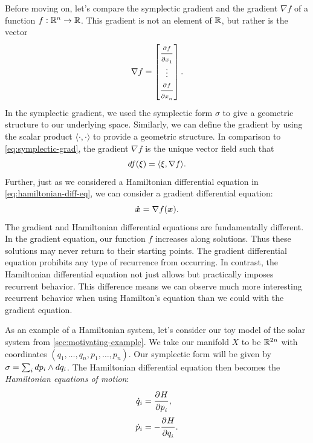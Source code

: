 \documentclass[twoside,letterpaper,10pt]{article}
\begin{document}
Before moving on, let's compare the symplectic gradient and the gradient $\nabla
f$ of a function $f : \mathbb{R}^n \to \mathbb{R}$.
This gradient is not an element of $\mathbb{R}$, but rather is the vector
\begin{equation*}
  \nabla f =
  \begin{bmatrix}
    \frac{\strut\partial^{}f}{\strut\partial x_1^{}}\\
    \vdots\\
    \frac{\strut\partial^{}f}{\strut\partial x_n^{}}
  \end{bmatrix}.
\end{equation*}
In the symplectic gradient, we used the symplectic form $\sigma$ to give a
geometric structure to our underlying space.
Similarly, we can define the gradient by using the scalar product $\langle
\cdot, \cdot \rangle$ to provide a geometric structure.
In comparison to \cref{eq:symplectic-grad}, the gradient $\nabla f$ is the
unique vector field such that
\begin{equation*}
  \mathop{}\!d f(\xi) = \langle \xi, \nabla f \rangle.
\end{equation*}
Further, just as we considered a Hamiltonian differential equation in
\cref{eq:hamiltonian-diff-eq}, we can consider a gradient differential equation:
\begin{equation*}
  \bm{\dot{x}} = \nabla f(\bm{x}).
\end{equation*}
The gradient and Hamiltonian differential equations are fundamentally different.
In the gradient equation, our function $f$ increases along solutions.
Thus these solutions may never return to their starting points.
The gradient differential equation prohibits any type of recurrence from
occurring.
In contrast, the Hamiltonian differential equation not just allows but
practically imposes recurrent behavior.
This difference means we can observe much more interesting recurrent behavior
when using Hamilton's equation than we could with the gradient equation.

As an example of a Hamiltonian system, let's consider our toy model of the solar
system from \cref{sec:motivating-example}.
We take our manifold $X$ to be $\mathbb{R}^{2n}$ with coordinates $(q_1, \ldots, q_n,
p_1, \ldots, p_n)$.
Our symplectic form will be given by $\sigma = \sum_{i} \mathop{}\!d p_i \wedge \mathop{}\!d
q_i$.
The Hamiltonian differential equation then becomes the \emph{Hamiltonian
  equations of motion}:
\begin{equation}
  \label{eq:hamiltonian-motion-eq}
  \begin{aligned}
    \dot{q}_i &= \frac{\strut\partial^{}H}{\strut\partial p_i^{}},\\
    \dot{p}_i &= - \frac{\strut\partial^{}H}{\strut\partial q_i^{}}.
  \end{aligned}
\end{equation}
\end{document}
